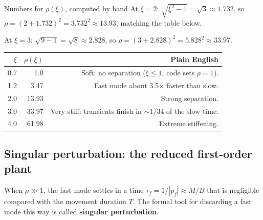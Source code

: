 \documentclass[11pt,a4paper]{article}
\begin{document}
\begin{examplebox}{Numbers for $\rho(\xi)$, computed by hand}
At $\xi=2$: $\sqrt{\xi^2-1}=\sqrt{3}\approx1.732$, so
$\rho=(2+1.732)^2=3.732^2\approx13.93$, matching the table below.

At $\xi=3$: $\sqrt{9-1}=\sqrt8\approx2.828$, so
$\rho=(3+2.828)^2=5.828^2\approx33.97$.
\begin{center}
\begin{tabular}{@{}rrr@{}}
\toprule
$\xi$ & $\rho(\xi)$ & Plain English \\
\midrule
0.7 & 1.0 & Soft: no separation ($\xi\le1$, code sets $\rho=1$). \\
1.2 & 3.47 & Fast mode about 3.5$\times$ faster than slow. \\
2.0 & 13.93 & Strong separation. \\
3.0 & 33.97 & Very stiff: transients finish in $\sim$1/34 of the slow time. \\
4.0 & 61.98 & Extreme stiffening. \\
\bottomrule
\end{tabular}
\end{center}
\end{examplebox}

\subsection{Singular perturbation: the reduced first-order plant}

When $\rho\gg 1$, the fast mode settles in a time
$\tau_f=1/|p_f|\approx M/B$ that is negligible compared with the movement
duration $T$. The formal tool for discarding a fast mode this way is called
\textbf{singular perturbation}.
\end{document}
